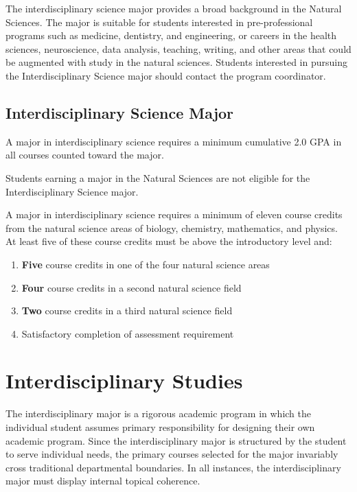 \documentclass[
  letterpaper,
]{scrbook}
\providecommand{\tightlist}{%
  \setlength{\itemsep}{0pt}\setlength{\parskip}{0pt}}
\begin{document}
The interdisciplinary science major provides a broad background in the
Natural Sciences. The major is suitable for students interested in
pre-professional programs such as medicine, dentistry, and engineering,
or careers in the health sciences, neuroscience, data analysis,
teaching, writing, and other areas that could be augmented with study in
the natural sciences. Students interested in pursuing the
Interdisciplinary Science major should contact the program coordinator.

\subsection{Interdisciplinary Science
Major}\label{interdisciplinary-science-major}

A major in interdisciplinary science requires a minimum cumulative 2.0
GPA in all courses counted toward the major.

Students earning a major in the Natural Sciences are not eligible for
the Interdisciplinary Science major.

A major in interdisciplinary science requires a minimum of eleven course
credits from the natural science areas of biology, chemistry,
mathematics, and physics. At least five of these course credits must be
above the introductory level and:

\begin{enumerate}
\def\labelenumi{\arabic{enumi}.}
\tightlist
\item
  \textbf{Five} course credits in one of the four natural science
  areas\\
\item
  \textbf{Four} course credits in a second natural science field\\
\item
  \textbf{Two} course credits in a third natural science field\\
\item
  Satisfactory completion of assessment requirement
\end{enumerate}

\section{Interdisciplinary Studies}\label{interdisciplinary-studies}

The interdisciplinary major is a rigorous academic program in which the
individual student assumes primary responsibility for designing their
own academic program. Since the interdisciplinary major is structured by
the student to serve individual needs, the primary courses selected for
the major invariably cross traditional departmental boundaries. In all
instances, the interdisciplinary major must display internal topical
coherence.
\end{document}
